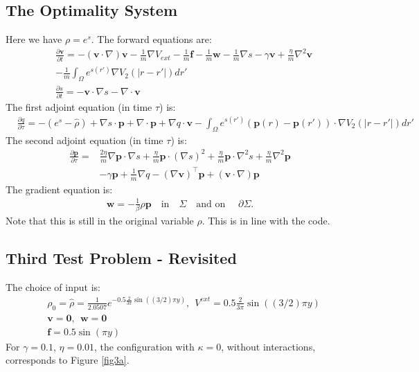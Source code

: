 \documentclass[11pt, a4paper]{article}
\theoremstyle{definition}
\newcommand{\Sta}{\rho}
\newcommand{\Stav}{\mathbf{v}}
\newcommand{\Adja}{\mathbf{p}}
\newcommand{\Adjb}{q}
\newcommand{\Con}{\mathbf{f}}
\begin{document}
\subsection{The Optimality System}
Here we have $\rho = e^s$. 
The forward equations are:
\begin{align*}
& \frac{\partial \Stav}{\partial t}= -  (\Stav \cdot \nabla)\Stav - \frac{1}{m} \nabla V_{ext} -\frac{1}{m}\Con -\frac{1}{m} \mathbf{w} - \frac{1}{m} \nabla s - \gamma \Stav +  \frac{\eta}{m} \nabla^2 \Stav \\
& - \frac{1}{m}\int_\Omega e^{s(r')} \nabla V_2(|r - r'|)dr'\\
&\frac{\partial s}{\partial t} = - \Stav \cdot \nabla s - \nabla \cdot \Stav  
\end{align*}
The first adjoint equation (in time $\tau$) is:
\begin{align*}
& \frac{\partial \Adjb}{\partial \tau} = - (e^s - \hat \rho)  + \nabla s \cdot \Adja + \nabla\cdot \Adja  +  \nabla \Adjb \cdot \Stav   - \int_\Omega e^{s(r')} (\Adja(r) - \Adja(r'))\cdot\nabla V_2(|r - r'|)dr'
\end{align*}
The second adjoint equation (in time $\tau$) is:
\begin{align*}
\frac{\partial \Adja}{\partial \tau} =& 
\frac{2 \eta}{m} \nabla \Adja \cdot \nabla s + \frac{\eta}{m} \Adja \cdot (\nabla s)^2 + \frac{\eta}{m} \Adja \cdot \nabla^2 s + \frac{\eta}{m} \nabla^2 \Adja \\
&  -\gamma  \Adja + \frac{1}{m} \nabla \Adjb - (\nabla \Stav)^\top\Adja + (\Stav \cdot \nabla)\Adja
\end{align*}
The gradient equation is:
\begin{align*}
\mathbf{w} = - \frac{1}{\beta} \Sta \Adja \quad \text{in} \quad \Sigma \quad \text{and on } \quad \partial\Sigma.
\end{align*}
Note that this is still in the original variable $\rho$. This is in line with the code.

\subsection{Third Test Problem - Revisited}
The choice of input is:
\begin{align*}
&\Sta_0 = \hat \Sta = \frac{1}{2.0507}e^{-0.5 \frac{2}{3 \pi}\sin((3/2)\pi y)}, \ \ V^{ext} =0.5 \frac{2}{3 \pi}\sin((3/2)\pi y)\\
&\Stav = \mathbf{0}, \ \  \mathbf{w} = \mathbf{0}\\
&\Con = 0.5 \sin(\pi y) 
\end{align*}
For $\gamma = 0.1$, $\eta = 0.01$, the configuration with $\kappa = 0$, without interactions, corresponds to Figure \ref{fig3a}.
\end{document}
